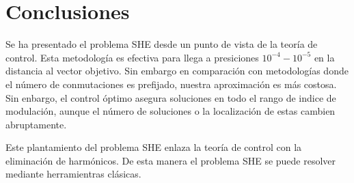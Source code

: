 \section{Conclusiones}\label{Section6}


Se ha presentado el problema SHE desde un punto de vista de la teoría de control. Esta metodología es efectiva para llega a presiciones $10^{-4}-10^{-5}$ en la distancia al vector objetivo. Sin embargo en comparación con metodologías donde el número de conmutaciones es prefijado, nuestra aproximación es más costosa. Sin enbargo, el control óptimo asegura soluciones en todo el rango de indice de modulación, aunque el número de soluciones o la localización de estas cambien abruptamente.

Este plantamiento del problema SHE enlaza la teoría de control con la eliminación de harmónicos. De esta manera el problema SHE se puede resolver mediante herramientras clásicas.
